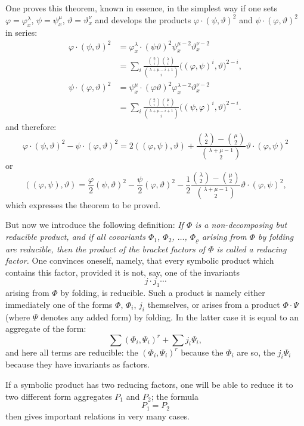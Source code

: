 \documentclass[10pt]{article}
\begin{document}
One proves this theorem, known in essence, in the simplest way if one sets $\varphi=\varphi_x^\lambda$, $\psi=\psi_x^\mu$, $\vartheta=\vartheta_x^\nu$ and develops the products $\varphi\cdot(\psi,\vartheta)^2$ and $\psi\cdot(\varphi,\vartheta)^2$ in series:
\[
\begin{aligned}
\varphi\cdot(\psi,\vartheta)^2
&=\varphi_x^\lambda\cdot(\psi\vartheta)^2\psi_x^{\mu-2}\vartheta_x^{\nu-2}\\
&=\sum_i\frac{\binom{2}{i}\binom{\lambda}{i}}{\binom{\lambda+\mu-i+1}{i}}\bigl((\varphi,\psi)^i,\vartheta\bigr)^{2-i},\\[0.25em]
\psi\cdot(\varphi,\vartheta)^2
&=\psi_x^\mu\cdot(\varphi\vartheta)^2\varphi_x^{\lambda-2}\vartheta_x^{\nu-2}\\
&=\sum_i\frac{\binom{2}{i}\binom{\mu}{i}}{\binom{\lambda+\mu-i+1}{i}}\bigl((\psi,\varphi)^i,\vartheta\bigr)^{2-i}.
\end{aligned}
\]
and therefore:
\[
\varphi\cdot(\psi,\vartheta)^2-\psi\cdot(\varphi,\vartheta)^2
=2((\varphi,\psi),\vartheta)+\frac{\binom{\lambda}{2}-\binom{\mu}{2}}{\binom{\lambda+\mu-1}{2}}\vartheta\cdot(\varphi,\psi)^2
\]
or
\[
((\varphi,\psi),\vartheta)=\frac{\varphi}{2}(\psi,\vartheta)^2-\frac{\psi}{2}(\varphi,\vartheta)^2-\frac12\frac{\binom{\lambda}{2}-\binom{\mu}{2}}{\binom{\lambda+\mu-1}{2}}\vartheta\cdot(\varphi,\psi)^2,
\]
which expresses the theorem to be proved.

But now we introduce the following definition: \emph{If $\Phi$ is a non-decomposing but reducible product, and if all covariants $\Phi_1$, $\Phi_2$, $\ldots$, $\Phi_\varrho$ arising from $\Phi$ by folding are reducible, then the product of the bracket factors of $\Phi$ is called a reducing factor.} One convinces oneself, namely, that every symbolic product which contains this factor, provided it is not, say, one of the invariants
\[
j\cdot j_1\cdots
\]
arising from $\Phi$ by folding, is reducible. Such a product is namely either immediately one of the forms $\Phi$, $\Phi_i$, $j_i$ themselves, or arises from a product $\Phi\cdot\Psi$ (where $\Psi$ denotes any added form) by folding. In the latter case it is equal to an aggregate of the form:
\[
\sum(\Phi_i,\Psi_i)^r+\sum j_i\Psi_i,
\]
and here all terms are reducible: the $(\Phi_i,\Psi_i)^r$ because the $\Phi_i$ are so, the $j_i\Psi_i$ because they have invariants as factors.

If a symbolic product has two reducing factors, one will be able to reduce it to two different form aggregates $P_1$ and $P_2$; the formula
\[
P_1=P_2
\]
then gives important relations in very many cases.
\end{document}
